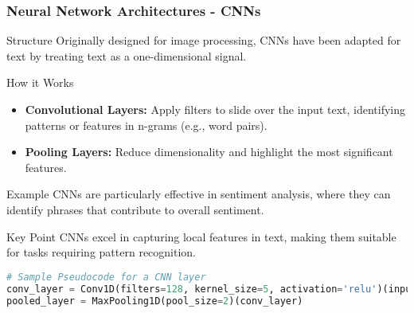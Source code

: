 \documentclass[aspectratio=169]{beamer}
\begin{document}
\begin{frame}[fragile]
    \frametitle{Neural Network Architectures - CNNs}
    \begin{block}{Structure}
        Originally designed for image processing, CNNs have been adapted for text by treating text as a one-dimensional signal.
    \end{block}
    
    \begin{block}{How it Works}
        \begin{itemize}
            \item \textbf{Convolutional Layers:} Apply filters to slide over the input text, identifying patterns or features in n-grams (e.g., word pairs).
            \item \textbf{Pooling Layers:} Reduce dimensionality and highlight the most significant features.
        \end{itemize}
    \end{block}
    
    \begin{block}{Example}
        CNNs are particularly effective in sentiment analysis, where they can identify phrases that contribute to overall sentiment.
    \end{block}
    
    \begin{block}{Key Point}
        CNNs excel in capturing local features in text, making them suitable for tasks requiring pattern recognition.
    \end{block}

    \begin{lstlisting}[language=Python]
# Sample Pseudocode for a CNN layer
conv_layer = Conv1D(filters=128, kernel_size=5, activation='relu')(input_text)
pooled_layer = MaxPooling1D(pool_size=2)(conv_layer)
    \end{lstlisting}
\end{frame}
\end{document}
